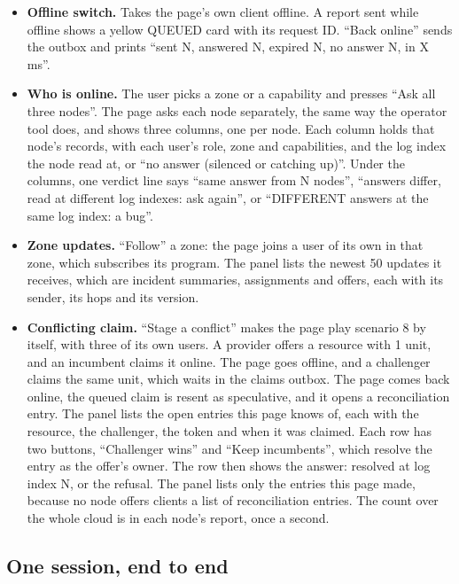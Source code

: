 \begin{itemize}
  \item \textbf{Offline switch.} Takes the page's own client offline. A report sent while offline shows a yellow QUEUED card with its request ID. ``Back online'' sends the outbox and prints ``sent N, answered N, expired N, no answer N, in X ms''.
  \item \textbf{Who is online.} The user picks a zone or a capability and presses ``Ask all three nodes''. The page asks each node separately, the same way the operator tool does, and shows three columns, one per node. Each column holds that node's records, with each user's role, zone and capabilities, and the log index the node read at, or ``no answer (silenced or catching up)''. Under the columns, one verdict line says ``same answer from N nodes'', ``answers differ, read at different log indexes: ask again'', or ``DIFFERENT answers at the same log index: a bug''.
  \item \textbf{Zone updates.} ``Follow'' a zone: the page joins a user of its own in that zone, which subscribes its program. The panel lists the newest 50 updates it receives, which are incident summaries, assignments and offers, each with its sender, its hops and its version.
  \item \textbf{Conflicting claim.} ``Stage a conflict'' makes the page play scenario 8 by itself, with three of its own users. A provider offers a resource with 1 unit, and an incumbent claims it online. The page goes offline, and a challenger claims the same unit, which waits in the claims outbox. The page comes back online, the queued claim is resent as speculative, and it opens a reconciliation entry. The panel lists the open entries this page knows of, each with the resource, the challenger, the token and when it was claimed. Each row has two buttons, ``Challenger wins'' and ``Keep incumbents'', which resolve the entry as the offer's owner. The row then shows the answer: resolved at log index N, or the refusal. The panel lists only the entries this page made, because no node offers clients a list of reconciliation entries. The count over the whole cloud is in each node's report, once a second.
\end{itemize}

\subsection{One session, end to end}
\label{sec:session}

